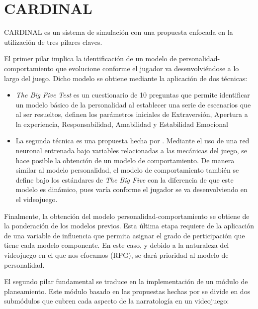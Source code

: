 \chapter{CARDINAL}


CARDINAL es un sistema de simulación con una propuesta enfocada en la utilización de tres pilares claves. 

El primer pilar implica la identificación de un modelo de personalidad-comportamiento que evolucione conforme el jugador va desenvolviéndose a lo largo del juego. Dicho modelo se obtiene mediante la aplicación de dos técnicas:
\begin{itemize}
\item \textit{The Big Five Test} es un cuestionario de 10 preguntas que permite identificar un modelo básico de la personalidad al establecer una serie de escenarios que al ser resueltos, definen los parámetros iniciales de Extraversión, Apertura a la experiencia, Responsabilidad, Amabilidad y Estabilidad Emocional

\item La segunda técnica es una propuesta hecha por \cite{de2018player}. Mediante el uso de una red neuronal entrenada bajo variables relacionadas a las mecánicas del juego, se hace posible la obtención de un modelo de comportamiento. De manera similar al modelo personalidad, el modelo de comportamiento también se define bajo los estándares de \textit{The Big Five} con la diferencia de que este modelo es dinámico, pues varía conforme el jugador se va desenvolviendo en el videojuego.
\end{itemize}

Finalmente, la obtención del modelo personalidad-comportamiento se obtiene de la ponderación de los modelos previos. Esta última etapa requiere de la aplicación de una variable de influencia que permita asignar el grado de perticipación que tiene cada modelo componente. En este caso, y debido a la naturaleza del videojuego en el que nos efocamos (RPG), se dará prioridad al modelo de personalidad. 

El segundo pilar fundamental se traduce en la implementación de un módulo de planeamiento. Este módulo basado en las propuestas hechas por \cite{young2007story} se divide en dos submódulos que cubren cada aspecto de la narratología en un videojuego:

